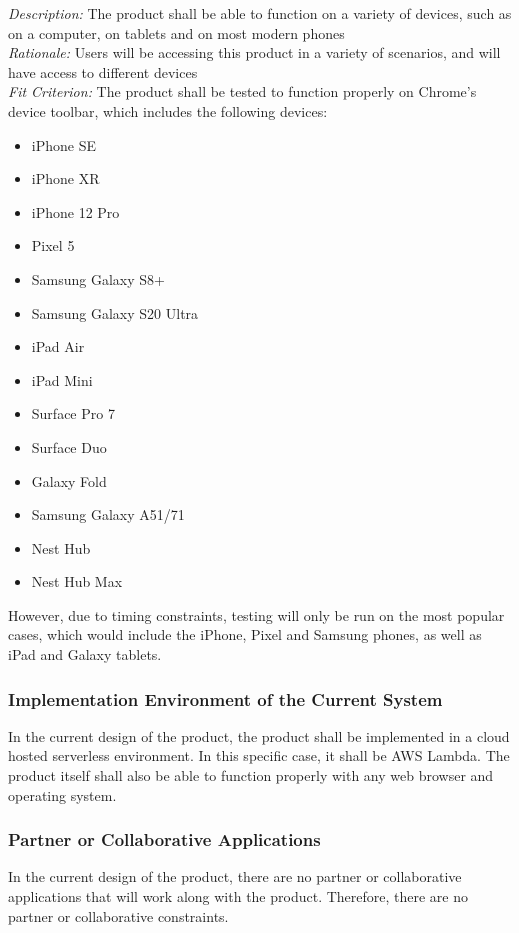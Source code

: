 \documentclass[12pt]{article}
\begin{document}
\emph{Description:} The product shall be able to function on a variety of devices, such as on a computer, on tablets and on most modern phones\\
\emph{Rationale:} Users will be accessing this product in a variety of scenarios, and will have access to different devices\\
\emph{Fit Criterion:} The product shall be tested to function properly on Chrome's device toolbar, which includes the following devices:
\begin{itemize}
	\item iPhone SE
	\item iPhone XR
	\item iPhone 12 Pro
	\item Pixel 5
	\item Samsung Galaxy S8+
	\item Samsung Galaxy S20 Ultra
	\item iPad Air
	\item iPad Mini
	\item Surface Pro 7
	\item Surface Duo
	\item Galaxy Fold
	\item Samsung Galaxy A51/71
	\item Nest Hub
	\item Nest Hub Max
\end{itemize}

However, due to timing constraints, testing will only be run on the most popular cases, which would
include the iPhone, Pixel and Samsung phones, as well as iPad and Galaxy tablets.

\subsubsection{Implementation Environment of the Current System}
In the current design of the product, the product shall be implemented in a cloud hosted serverless
environment. In this specific case, it shall be AWS Lambda. The product itself shall also be able
to function properly with any web browser and operating system.

\subsubsection{Partner or Collaborative Applications}
In the current design of the product, there are no partner or collaborative applications that will
work along with the product. Therefore, there are no partner or collaborative constraints.
\end{document}
